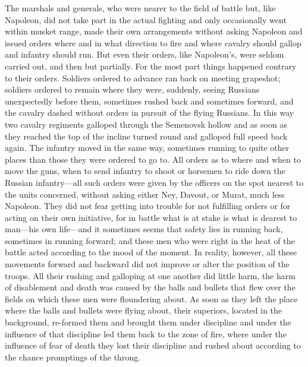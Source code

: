 The marshals and generals, who were nearer to the field of battle
but, like Napoleon, did not take part in the actual fighting and
only occasionally went within musket range, made their own
arrangements without asking Napoleon and issued orders where and
in what direction to fire and where cavalry should gallop and
infantry should run. But even their orders, like Napoleon's, were
seldom carried out, and then but partially. For the most part
things happened contrary to their orders.  Soldiers ordered to
advance ran back on meeting grapeshot; soldiers ordered to remain
where they were, suddenly, seeing Russians unexpectedly before
them, sometimes rushed back and sometimes forward, and the
cavalry dashed without orders in pursuit of the flying Russians.
In this way two cavalry regiments galloped through the Semenovsk
hollow and as soon as they reached the top of the incline turned
round and galloped full speed back again. The infantry moved in
the same way, sometimes running to quite other places than those
they were ordered to go to. All orders as to where and when to
move the guns, when to send infantry to shoot or horsemen to ride
down the Russian infantry---all such orders were given by the
officers on the spot nearest to the units concerned, without
asking either Ney, Davout, or Murat, much less Napoleon. They did
not fear getting into trouble for not fulfilling orders or for
acting on their own initiative, for in battle what is at stake is
what is dearest to man---his own life---and it sometimes seems
that safety lies in running back, sometimes in running forward;
and these men who were right in the heat of the battle acted
according to the mood of the moment. In reality, however, all
these movements forward and backward did not improve or alter the
position of the troops. All their rushing and galloping at one
another did little harm, the harm of disablement and death was
caused by the balls and bullets that flew over the fields on
which these men were floundering about. As soon as they left the
place where the balls and bullets were flying about, their
superiors, located in the background, re-formed them and brought
them under discipline and under the influence of that discipline
led them back to the zone of fire, where under the influence of
fear of death they lost their discipline and rushed about
according to the chance promptings of the throng.


